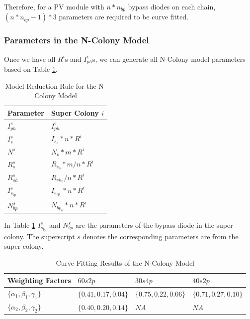 Therefore, for a PV module with $n*n_{bp}$ bypass diodes on each chain, $(n*n_{bp} - 1)*3$ parameters are required to be curve fitted.

\subsubsection{Parameters in the N-Colony Model}
Once we have all $R^i$s and $I_{ph}^i$s, we can generate all N-Colony model parameters based on Table \ref{table:ncRule}.
\begin{table}[tb]
  \caption{Model Reduction Rule for the N-Colony Model }
  \label{table:ncRule}
  \centering
  \normalsize
\begin{tabular}{|l|l|}
  \hline
  Parameter & Super Colony $i$ \\
  \hline
  $I_{ph}^s$ & $I_{ph}^i$ \\
  \hline
  $I_s^s$ & $I_{s_o}*n*R^i $\\
  \hline
  $N^s$ & $N_o*m*R^i $\\
  \hline
  $R_s^s$ & $R_{s_o}*m/n*R^i$ \\
  \hline
  $R_{sh}^s$ & $R_{sh_o}/n*R^i$  \\
  \hline
  $I_{s_{bp}}^s$ & $I_{s_{bp_o}}*n*R^i$  \\
  \hline
  $N_{bp}^s$ & $N_{bp_o}*n*R^i$  \\
  \hline
\end{tabular}
\end{table}
In Table \ref{table:ncRule} $I_{s_{bp}}^s$ and $N_{bp}^s$ are the parameters of the bypass diode in the super colony. The superscript $s$ denotes the corresponding parameters are from the super colony.

\begin{table}[tb]
  \caption{Curve Fitting Results of the N-Colony Model}
  \label{table:ncCurveFit}
  \centering
  \normalsize
\begin{tabular}{|l|l|l|l|}
  \hline
  Weighting Factors & $60s2p$ & $30s4p$ & $40s2p$\\
  \hline
  $\{\alpha_1, \beta_1, \gamma_1\}$ &$\{0.41, 0.17, 0.04\} $ & $\{0.75, 0.22, 0.06\} $ & $\{0.71, 0.27, 0.10\}$ \\
  \hline
  $\{\alpha_2, \beta_2, \gamma_2\}$ &$\{0.40, 0.20, 0.14\} $ & $NA $ & $NA$ \\
  \hline
\end{tabular}
\end{table}


